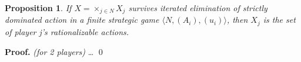 \documentclass[slidestop,serif,compress]{beamer}    %
\newcommand{\Ra}{\Rightarrow}
\theoremstyle{plain}
\newtheorem{prop}{Proposition}
\theoremstyle{definition}
\begin{document}
{\begin{prop}\label{prop:rational_strict_el_dom}
  If $X=\times_{j\in N}X_j$ survives iterated elimination of strictly dominated action in a finite strategic game $\langle N,(A_i),(u_i)\rangle$, then $X_j$ is the set of player j's rationalizable actions.
\end{prop}
\textbf{Proof. }\emph{(for 2 players)}
\dots%
\qed



}
\end{document}
